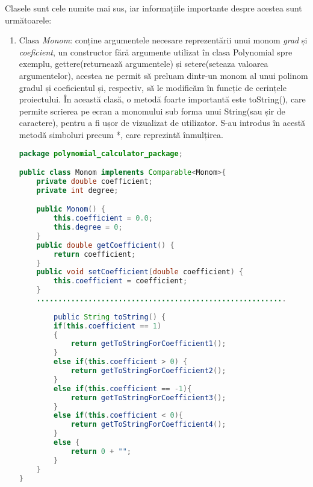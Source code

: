 \documentclass[a4paper,12pt]{article}
\begin{document}
\begin{enumerate}
\begin{enumerate}
\end{enumerate}
Clasele sunt cele numite mai sus, iar informațiile importante despre acestea sunt următoarele:
\begin{enumerate}
\item Clasa \emph{Monom}: conține argumentele necesare reprezentării unui monom \emph{grad} și \emph{coeficient}, un constructor fără argumente utilizat în clasa Polynomial spre exemplu, gettere(returnează argumentele) și setere(seteaza valoarea argumentelor), acestea ne permit să preluam dintr-un monom al unui polinom gradul și coeficientul și, respectiv, să le modificăm în funcție de cerințele proiectului. În această clasă, o metodă foarte importantă este toString(), care permite scrierea pe ecran a monomului sub forma unui String(sau șir de caractere), pentru a fi ușor de vizualizat de utilizator. S-au introdus în acestă metodă simboluri  precum *, care reprezintă înmulțirea.
\newline
\begin{lstlisting}[language = Java]
package polynomial_calculator_package;

public class Monom implements Comparable<Monom>{
    private double coefficient;
    private int degree;

    public Monom() {
        this.coefficient = 0.0;
        this.degree = 0;
    }
    public double getCoefficient() {
        return coefficient;
    }
    public void setCoefficient(double coefficient) {
        this.coefficient = coefficient;
    }
    ..........................................................
    
        public String toString() {
        if(this.coefficient == 1)
        {
            return getToStringForCoefficient1();
        }
        else if(this.coefficient > 0) {
            return getToStringForCoefficient2();
        }
        else if(this.coefficient == -1){
            return getToStringForCoefficient3();
        }
        else if(this.coefficient < 0){
            return getToStringForCoefficient4();
        }
        else {
            return 0 + "";
        }
    }
}
\end{lstlisting}



\end{enumerate}
\end{enumerate}
\end{document}

